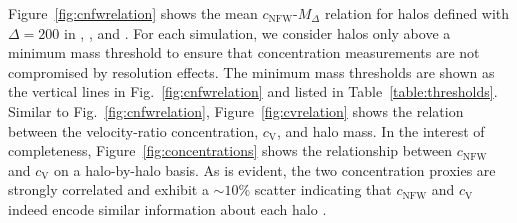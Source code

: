 \documentclass[usenatbib,usegraphicx,letterpaper]{mn2e}
\begin{document}
Figure~\ref{fig:cnfwrelation} shows the mean $c_{\mathrm{NFW}}$-$M_{\Delta}$ relation for halos defined with
$\Delta=200$ in \simA, \simB, and \simC. For each simulation, we consider halos only above a minimum mass threshold 
to ensure that concentration measurements are not compromised by resolution effects. The minimum mass 
thresholds are shown as the vertical lines in Fig.~\ref{fig:cnfwrelation} and listed in Table~\ref{table:thresholds}. 
Similar to Fig.~\ref{fig:cnfwrelation}, Figure~\ref{fig:cvrelation} shows the relation between the velocity-ratio concentration, $c_{\mathrm{V}}$, and halo mass. In the interest of completeness, Figure~\ref{fig:concentrations} shows the relationship 
between $c_{\mathrm{NFW}}$ and $c_{\mathrm{V}}$ on a halo-by-halo basis. As is evident, the two concentration 
proxies are strongly correlated and exhibit a $\sim 10\%$ scatter indicating that $c_{\mathrm{NFW}}$ and $c_{\mathrm{V}}$ 
indeed encode similar information about each halo .
\end{document}
